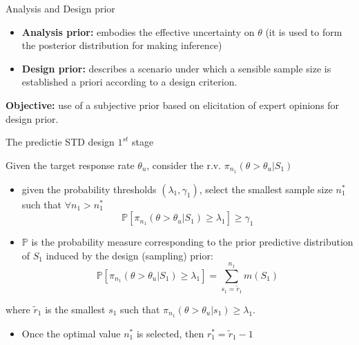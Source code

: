 \documentclass{beamer}
\begin{document}
\begin{frame}{Analysis and Design prior}

\begin{itemize}
\itemsep1pt\parskip0pt
\item
  \textbf{Analysis prior:} embodies the effective uncertainty on
  \(\theta\) (it is used to form the posterior distribution for making
  inference)
\item
  \textbf{Design prior:} describes a scenario under which a sensible
  sample size is established a priori according to a design criterion.
\end{itemize}

{ \textbf{Objective:}} use of a subjective prior based on elicitation of
expert opinions for design prior.

\end{frame}


\begin{frame}{The predictie STD design \(1^{st}\) stage}

Given the target response rate \(\theta_u\), consider the r.v.
\(\pi_{n_1}(\theta > \theta_u \vert S_1)\)

\begin{itemize}
\item
  given the probability thresholds \((\lambda_1,\gamma_1)\), select the
  smallest sample size \(n_1^*\) such that \(\forall n_1>n_1^*\) \[
  \mathbb{P}[\pi_{n_1}(\theta >\theta_u\vert S_1)\geq\lambda_1]\geq\gamma_1
  \]
\item
  \(\mathbb{P}\) is the probability measure corresponding to the prior
  predictive distribution of \(S_1\) induced by the design (sampling)
  prior: \[
  \mathbb{P}[\pi_{n_1}(\theta >\theta_u\vert S_1)\geq\lambda_1]=\sum_{s_1=\tilde{r}_1}^{n_1}m(S_1)
  \]
\end{itemize}

where \(\tilde{r}_1\) is the smallest \(s_1\) such that
\(\pi_{n_1}(\theta >\theta_u\vert s_1)\geq\lambda_1\).

\begin{itemize}
\itemsep1pt\parskip0pt
\item
  Once the optimal value \(n^*_1\) is selected, then
  \(r^*_1=\tilde{r}_1-1\)
\end{itemize}

\end{frame}
\end{document}
